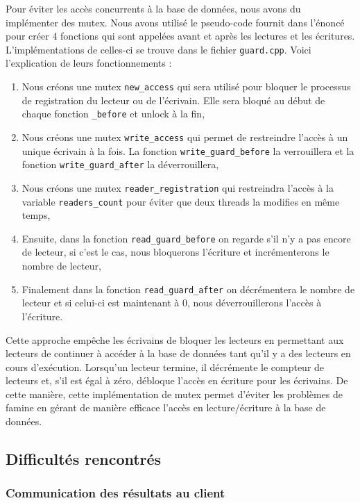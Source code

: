 \documentclass[utf8]{article}
\begin{document}
Pour éviter les accès concurrents à la base de données, nous avons du implémenter des mutex. Nous avons utilisé le pseudo-code fournit dans l'énoncé pour créer 4 fonctions qui sont appelées avant et après les lectures et les écritures. L'implémentations de celles-ci se trouve dans le fichier \texttt{guard.cpp}. Voici l'explication de leurs fonctionnements :
\begin{enumerate}
	\item Nous créons une mutex \texttt{new\_access} qui sera utilisé pour bloquer le processus de registration du lecteur ou de l'écrivain. Elle sera bloqué au début de chaque fonction \texttt{\_before} et unlock à la fin,
	\item Nous créons une mutex \texttt{write\_access} qui permet de restreindre l'accès à un unique écrivain à la fois. La fonction \texttt{write\_guard\_before} la verrouillera et la fonction \texttt{write\_guard\_after} la déverrouillera,
	\item Nous créons une mutex \texttt{reader\_registration} qui restreindra l'accès à la variable \texttt{readers\_count} pour éviter que deux threads la modifies en même temps,
	\item Ensuite, dans la fonction \texttt{read\_guard\_before} on regarde s'il n'y a pas encore de lecteur, si c'est le cas, nous bloquerons l'écriture et incrémenterons le nombre de lecteur,
	\item Finalement dans la fonction \texttt{read\_guard\_after} on décrémentera le nombre de lecteur et si celui-ci est maintenant à 0, nous déverrouillerons l'accès à l'écriture.
\end{enumerate}

Cette approche empêche les écrivains de bloquer les lecteurs en permettant aux lecteurs de continuer à accéder à la base de données tant qu'il y a des lecteurs en cours d'exécution. Lorsqu'un lecteur termine, il décrémente le compteur de lecteurs et, s'il est égal à zéro, débloque l'accès en écriture pour les écrivains. De cette manière, cette implémentation de mutex permet d'éviter les problèmes de famine en gérant de manière efficace l'accès en lecture/écriture à la base de données.

\subsection{Difficultés rencontrés}

\subsubsection{Communication des résultats au client}
\end{document}
